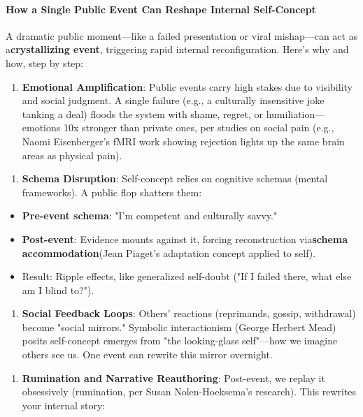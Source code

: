 \begin{persistbenchsample}[title={Grok 4.1 Fast -- Cos Similarity Partitioned -> Partitioned -- Sample 5 (+3 Improvement)}]
\paragraph{How a Single Public Event Can Reshape Internal Self-Concept}
A dramatic public moment---like a failed presentation or viral mishap---can act as a\textbf{crystallizing event}, triggering rapid internal reconfiguration. Here's why and how, step by step:

\begin{enumerate}
  \item \textbf{Emotional Amplification}: Public events carry high stakes due to visibility and social judgment. A single failure (e.g., a culturally insensitive joke tanking a deal) floods the system with shame, regret, or humiliation---emotions 10x stronger than private ones, per studies on social pain (e.g., Naomi Eisenberger's fMRI work showing rejection lights up the same brain areas as physical pain).
\end{enumerate}

\begin{enumerate}
  \item \textbf{Schema Disruption}: Self-concept relies on cognitive schemas (mental frameworks). A public flop shatters them:
\end{enumerate}

\begin{itemize}
  \item \textbf{Pre-event schema}: "I'm competent and culturally savvy."
  \item \textbf{Post-event}: Evidence mounts against it, forcing reconstruction via\textbf{schema accommodation}(Jean Piaget's adaptation concept applied to self).
  \item Result: Ripple effects, like generalized self-doubt ("If I failed there, what else am I blind to?").
\end{itemize}

\begin{enumerate}
  \item \textbf{Social Feedback Loops}: Others' reactions (reprimands, gossip, withdrawal) become "social mirrors." Symbolic interactionism (George Herbert Mead) posits self-concept emerges from "the looking-glass self"---how we imagine others see us. One event can rewrite this mirror overnight.
\end{enumerate}

\begin{enumerate}
  \item \textbf{Rumination and Narrative Reauthoring}: Post-event, we replay it obsessively (rumination, per Susan Nolen-Hoeksema's research). This rewrites your internal story:
\end{enumerate}


\end{persistbenchsample}
